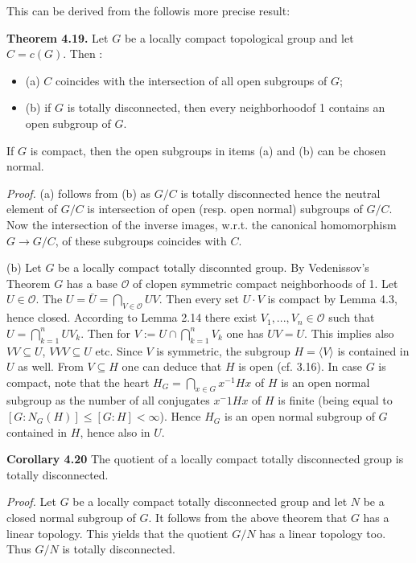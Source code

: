 \documentclass[12pt]{article}
\begin{document}
    This can be derived from the followis more precise result:


\textbf{Theorem 4.19.} Let $G$ be a locally compact topological group and let $C = c(G)$. Then :


    \begin{itemize}

    \item (a) $C$ coincides with the intersection of all open subgroups of $G$;
    
    \item (b) if $G$ is totally disconnected, then every neighborhoodof 1 contains an open subgroup of $G$.

    \end{itemize}


    If $G$ is compact, then the open subgroups in items (a) and (b) can be chosen normal.


    \emph{Proof.} (a) follows from (b) as $G/C$ is totally disconnected hence the neutral element of $G/C$ is intersection of
open (resp. open normal) subgroups of $G/C$. Now the intersection of the inverse images, w.r.t. the canonical
homomorphism $G \to G/C$, of these subgroups coincides with $C$.


    (b) Let $G$ be a locally compact totally disconnted group. By Vedenissov's Theorem $G$ has a base $\mathcal{O}$ of clopen
symmetric compact neighborhoods of 1. Let $U \in \mathcal{O}$. The $U = \bar{U} = \bigcap_{V \in \mathcal{O}} UV$. Then every set $U · V$ is compact
by Lemma 4.3, hence closed. According to Lemma 2.14 there exist $V_1, . . . , V_n \in \mathcal{O}$ such that $U = \bigcap^n_{k=1} UV_k$.
Then for $V := U \cap \bigcap^n_{k=1} V_k$ one has $UV = U$. This implies also $VV \subseteq U$, $VVV \subseteq U$ etc. Since $V$ is symmetric,
the subgroup $H = \langle V \rangle$ is contained in $U$ as well. From $V \subseteq H$ one can deduce that $H$ is open (cf. 3.16). In
case $G$ is compact, note that the heart $H_G =\bigcap_{x \in G} x^{-1}Hx$ of $H$ is an open normal subgroup as the number of
all conjugates $x^-{1}Hx$ of $H$ is finite (being equal to $[G : N_G (H)] \leq [G : H] < \infty$). Hence $H_G$ is an open normal
subgroup of $G$ contained in $H$, hence also in $U$.


\textbf{Corollary 4.20} The quotient of a locally compact totally disconnected group is totally disconnected.


    \emph{Proof.} Let $G$ be a locally compact totally disconnected group and let $N$ be a closed normal subgroup of $G$. It
follows from the above theorem that $G$ has a linear topology. This yields that the quotient $G/N$ has a linear
topology too. Thus $G/N$ is totally disconnected.
\end{document}
